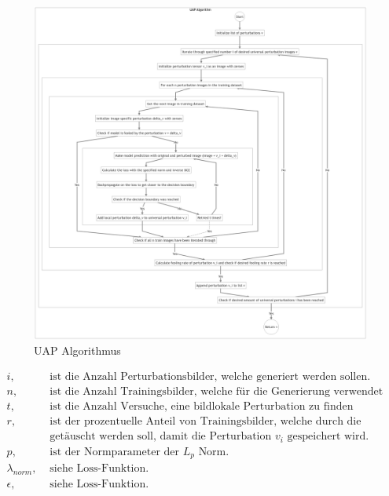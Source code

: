 \begin{figure}[H]
    \centering
    \includegraphics[width=14.5cm]{01-images/05-UAP_ALG}
    \caption{UAP Algorithmus}
    \label{fig:05-uap_algorithm}
\end{figure}


\begin{align*}
i, &\text{ ist die Anzahl Perturbationsbilder, welche generiert werden sollen.} \\
n, &\text{ ist die Anzahl Trainingsbilder, welche für die Generierung verwendet werden.} \\
t, &\text{ ist die Anzahl Versuche, eine bildlokale Perturbation zu finden}\\
r, &\text{ ist der prozentuelle Anteil von Trainingsbilder, welche durch die Perturbationen} \\ 
&\text{  getäuscht werden soll, damit die Perturbation } v_i \text{ gespeichert wird.} \\
p, &\text{ ist der Normparameter der } L_p \text{ Norm.}\\
\lambda_{norm}, &\text{ siehe Loss-Funktion.}\\
\epsilon, &\text{ siehe Loss-Funktion.}
\end{align*}